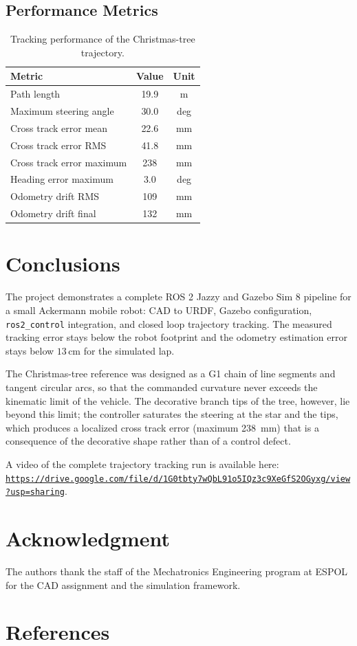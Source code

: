 \documentclass[conference]{IEEEtran}
\begin{document}
\subsection{Performance Metrics}

\begin{table}[htbp]
  \centering
  \caption{Tracking performance of the Christmas-tree trajectory.}
  \label{tab:results}
  \begin{tabular}{lcc}
    \toprule
    \textbf{Metric} & \textbf{Value} & \textbf{Unit} \\
    \midrule
    Path length & 19.9 & m \\
    Maximum steering angle & 30.0 & deg \\
    Cross track error mean & 22.6 & mm \\
    Cross track error RMS & 41.8 & mm \\
    Cross track error maximum & 238 & mm \\
    Heading error maximum & 3.0 & deg \\
    Odometry drift RMS & 109 & mm \\
    Odometry drift final & 132 & mm \\
    \bottomrule
  \end{tabular}
\end{table}

\section{Conclusions}
\label{sec:concl}

The project demonstrates a complete ROS 2 Jazzy and Gazebo Sim 8 pipeline for a
small Ackermann mobile robot: CAD to URDF, Gazebo configuration,
\texttt{ros2\_control} integration, and closed loop trajectory tracking. The
measured tracking error stays below the robot footprint and the odometry
estimation error stays below $13$\,cm for the simulated lap.

The Christmas-tree reference was designed as a G1 chain of line segments and
tangent circular arcs, so that the commanded curvature never exceeds the
kinematic limit of the vehicle. The decorative branch tips of the tree, however,
lie beyond this limit; the controller saturates the steering at the star and the
tips, which produces a localized cross track error (maximum 238~mm) that is a
consequence of the decorative shape rather than of a control defect.

A video of the complete trajectory tracking run is available here:
\texttt{\url{https://drive.google.com/file/d/1G0tbty7wQbL91o5IQz3c9XeGfS2OGyxg/view?usp=sharing}}.

\section*{Acknowledgment}
The authors thank the staff of the Mechatronics Engineering program at ESPOL for
the CAD assignment and the simulation framework.

\section*{References}



\end{document}
